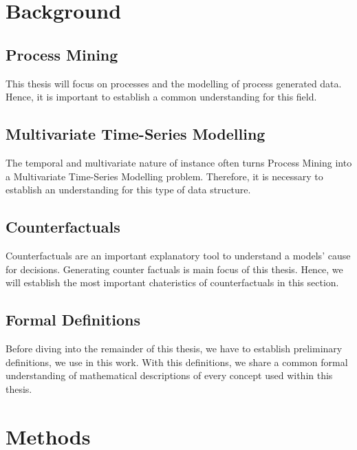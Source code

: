 \documentclass[12pt,a4paper]{report}
\begin{document}
\chapter{Background}
\label{ch:prereq}

\section{Process Mining}
\label{sec:process}
This thesis will focus on processes and the modelling of process generated data. Hence, it is important to establish a common understanding for this field.



\section{Multivariate Time-Series Modelling}
\label{sec:sequences}
The temporal and multivariate nature of \gls{instance} often turns Process Mining into a Multivariate Time-Series Modelling problem. Therefore, it is necessary to establish an understanding for this type of data structure.



\section{Counterfactuals}
\label{sec:counterfactuals}
Counterfactuals are an important explanatory tool to understand a models' cause for decisions. Generating counter factuals is main focus of this thesis. Hence, we will establish the most important chateristics of counterfactuals in this section.




\section{Formal Definitions}
\label{sec:formulas}
Before diving into the remainder of this thesis, we have to establish preliminary definitions, we use in this work. With this definitions, we share a common formal understanding of mathematical descriptions of every concept used within this thesis. 








\chapter{Methods}
\label{sec:methods}
\end{document}
